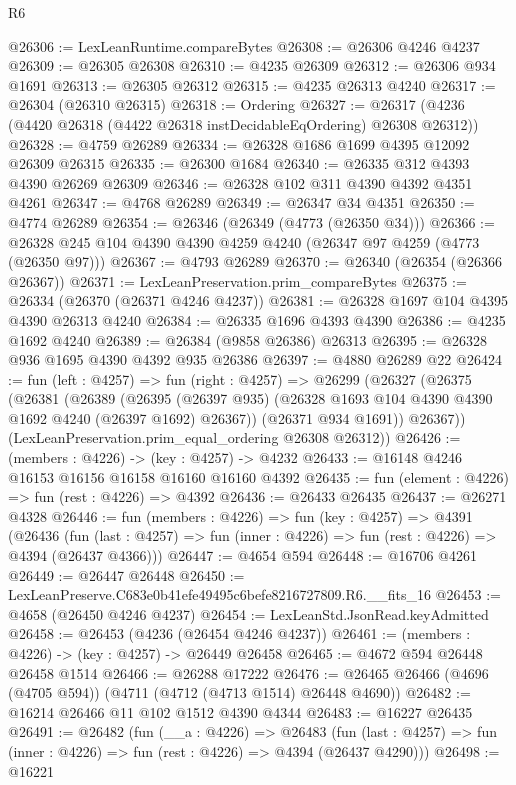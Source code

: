 \begin{lexlean}{R6}
\begin{coremodule}
@26306 := LexLeanRuntime.compareBytes
@26308 := @26306 @4246 @4237
@26309 := @26305 @26308
@26310 := @4235 @26309
@26312 := @26306 @934 @1691
@26313 := @26305 @26312
@26315 := @4235 @26313 @4240
@26317 := @26304 (@26310 @26315)
@26318 := Ordering
@26327 := @26317 (@4236 (@4420 @26318 (@4422 @26318 instDecidableEqOrdering) @26308 @26312))
@26328 := @4759 @26289
@26334 := @26328 @1686 @1699 @4395 @12092 @26309 @26315
@26335 := @26300 @1684
@26340 := @26335 @312 @4393 @4390 @26269 @26309
@26346 := @26328 @102 @311 @4390 @4392 @4351 @4261
@26347 := @4768 @26289
@26349 := @26347 @34 @4351
@26350 := @4774 @26289
@26354 := @26346 (@26349 (@4773 (@26350 @34)))
@26366 := @26328 @245 @104 @4390 @4390 @4259 @4240 (@26347 @97 @4259 (@4773 (@26350 @97)))
@26367 := @4793 @26289
@26370 := @26340 (@26354 (@26366 @26367))
@26371 := LexLeanPreservation.prim_compareBytes
@26375 := @26334 (@26370 (@26371 @4246 @4237))
@26381 := @26328 @1697 @104 @4395 @4390 @26313 @4240
@26384 := @26335 @1696 @4393 @4390
@26386 := @4235 @1692 @4240
@26389 := @26384 (@9858 @26386) @26313
@26395 := @26328 @936 @1695 @4390 @4392 @935 @26386
@26397 := @4880 @26289 @22
@26424 := fun (left : @4257) =>
  fun (right : @4257) =>
  @26299
    (@26327
      (@26375
        (@26381
          (@26389
            (@26395 (@26397 @935) (@26328 @1693 @104 @4390 @4390 @1692 @4240 (@26397 @1692) @26367))
            (@26371 @934 @1691))
          @26367))
      (LexLeanPreservation.prim_equal_ordering @26308 @26312))
@26426 := (members : @4226) -> (key : @4257) -> @4232
@26433 := @16148 @4246 @16153 @16156 @16158 @16160 @16160 @4392
@26435 := fun (element : @4226) => fun (rest : @4226) => @4392
@26436 := @26433 @26435
@26437 := @26271 @4328
@26446 := fun (members : @4226) =>
  fun (key : @4257) =>
  @4391
    (@26436
      (fun (last : @4257) => fun (inner : @4226) => fun (rest : @4226) => @4394 (@26437 @4366)))
@26447 := @4654 @594
@26448 := @16706 @4261
@26449 := @26447 @26448
@26450 := LexLeanPreserve.C683e0b41efe49495c6befe8216727809.R6.__fits_16
@26453 := @4658 (@26450 @4246 @4237)
@26454 := LexLeanStd.JsonRead.keyAdmitted
@26458 := @26453 (@4236 (@26454 @4246 @4237))
@26461 := (members : @4226) -> (key : @4257) -> @26449 @26458
@26465 := @4672 @594 @26448 @26458 @1514
@26466 := @26288 @17222
@26476 := @26465 @26466 (@4696 (@4705 @594)) (@4711 (@4712 (@4713 @1514) @26448 @4690))
@26482 := @16214 @26466 @11 @102 @1512 @4390 @4344
@26483 := @16227 @26435
@26491 := @26482
    (fun (__a : @4226) =>
    @26483
      (fun (last : @4257) => fun (inner : @4226) => fun (rest : @4226) => @4394 (@26437 @4290)))
@26498 := @16221

\end{coremodule}
\end{lexlean}
